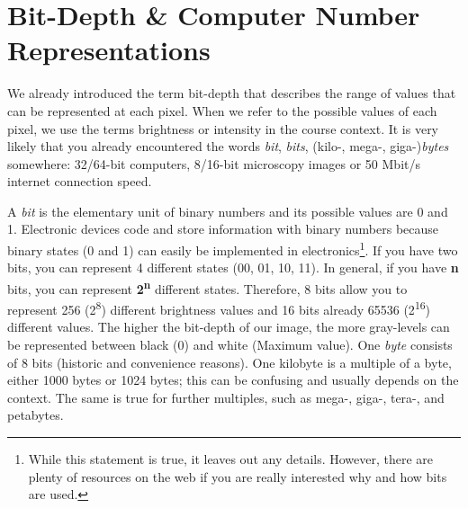 \section{Bit-Depth \& Computer Number Representations}

We already introduced the term bit-depth that describes the range of values that can be represented at each pixel. When we refer to the possible values of each pixel, we use the terms brightness or intensity in the course context. It is very likely that you already encountered the words \emph{bit}, \emph{bits}, (kilo-, mega-, giga-)\emph{bytes} somewhere: 32/64-bit computers, 8/16-bit microscopy images or 50 Mbit/s internet connection speed.

A \emph{bit} is the elementary unit of binary numbers and its possible values are 0 and 1. Electronic devices code and store information with binary numbers because binary states (0 and 1) can easily be implemented in electronics\footnote{While this statement is true, it leaves out any details. However, there are plenty of resources on the web if you are really interested why and how bits are used.}. If you have two bits, you can represent 4 different states (00, 01, 10, 11). In general, if you have \textbf{n} bits, you can represent \textbf{2\textsuperscript{n}} different states. Therefore, 8 bits allow you to represent 256 (2\textsuperscript{8}) different brightness values and 16 bits already 65536 (2\textsuperscript{16}) different values. The higher the bit-depth of our image, the more gray-levels can be represented between black (0) and white (Maximum value). One \emph{byte} consists of 8 bits (historic and convenience reasons). One kilobyte is a multiple of a byte, either 1000 bytes or 1024 bytes; this can be confusing and usually depends on the context. The same is true for further multiples, such as mega-, giga-, tera-, and petabytes.


